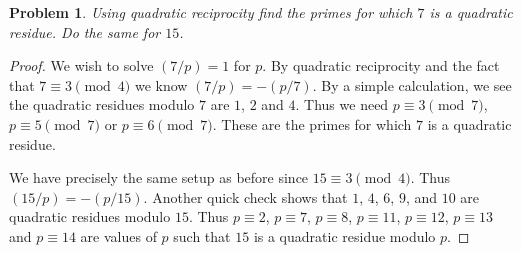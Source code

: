 \documentclass{article}
\newtheorem{problem}{Problem}
\begin{document}
\begin{problem}
Using quadratic reciprocity find the primes for which $7$ is a quadratic residue. Do the same for $15$.
\end{problem}
\begin{proof}
We wish to solve $(7/p) = 1$ for $p$. By quadratic reciprocity and the fact that $7 \equiv 3 \pmod{4}$ we know $(7/p) = -(p/7)$. By a simple calculation, we see the quadratic residues modulo $7$ are $1$, $2$ and $4$. Thus we need $p \equiv 3 \pmod{7}$, $p \equiv 5 \pmod{7}$ or $p \equiv 6 \pmod{7}$. These are the primes for which $7$ is a quadratic residue.

We have precisely the same setup as before since $15 \equiv 3 \pmod{4}$. Thus $(15/p) = -(p/15)$. Another quick check shows that $1$, $4$, $6$, $9$, and $10$ are quadratic residues modulo $15$. Thus $p \equiv 2$, $p \equiv 7$, $p \equiv 8$, $p \equiv 11$, $p \equiv 12$, $p \equiv 13$ and $p \equiv 14$ are values of $p$ such that $15$ is a quadratic residue modulo $p$.
\end{proof}
\end{document}
